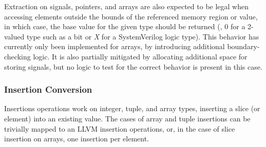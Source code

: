 


Extraction on signals, pointers, and arrays are also expected to be legal when accessing elements outside the bounds of the referenced memory region or value, in which case, the base value for the given type should be returned (\ie, $0$ for a 2-valued type such as a bit or \textit{X} for a SystemVerilog logic type). This behavior has currently only been implemented for arrays, by introducing additional boundary-checking logic. It is also partially mitigated by allocating additional space for storing signals, but no logic to test for the correct behavior is present in this case.


\subsubsection{Insertion Conversion}
Insertions operations work on integer, tuple, and array types, inserting a slice (or element) into an existing value. The cases of array and tuple insertions can be trivially mapped to an LLVM insertion operations, or, in the case of slice insertion on arrays, one insertion per element.

